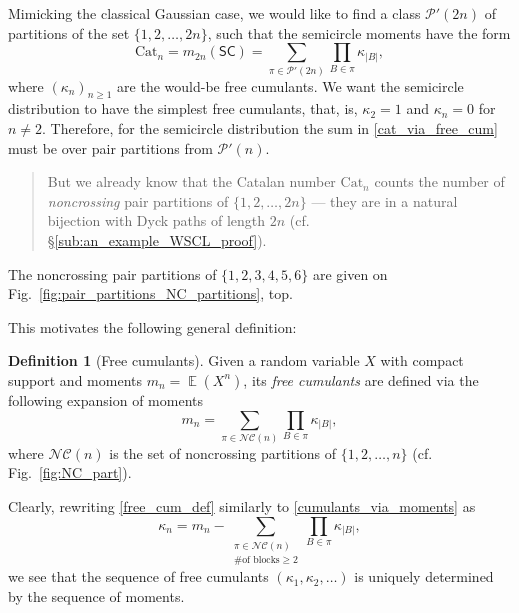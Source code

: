 \documentclass[letterpaper,11pt,oneside,reqno]{amsart}
\numberwithin{equation}{section}
\newcommand{\SC}{\mathsf{SC}}
\DeclareMathOperator{\EE}{\mathbb{E}}
\theoremstyle{definition}
\newtheorem{definition}[proposition]{Definition}
\begin{document}
Mimicking the classical Gaussian case, we would like to
find a class $\mathcal{P}'(2n)$ of partitions of the set $\{1,2,\ldots,2n\}$, such that the semicircle
moments have the form
\begin{equation}\label{cat_via_free_cum}
	\mathrm{Cat}_{n}=m_{2n}(\SC)=\sum_{\pi\in \mathcal{P}'(2n)}\prod_{B\in\pi} \kappa_{|B|},
\end{equation}
where $(\kappa_n)_{n\ge1}$ are the would-be free cumulants.
We want the semicircle distribution to have the simplest free cumulants, 
that, is, $\kappa_2=1$ and $\kappa_n=0$ for $n\ne2$.
Therefore, for the semicircle distribution
the sum in \eqref{cat_via_free_cum} must be over pair partitions from 
$\mathcal{P}'(n)$. 
\begin{quote}
	But we already know that the 
	Catalan number $\mathrm{Cat}_{n}$ counts the 
	number of \emph{noncrossing} pair partitions of $\{1,2,\ldots,2n\}$
	--- they are in a natural bijection with Dyck paths 
	of length $2n$ (cf. \S \ref{sub:an_example_WSCL_proof}).
\end{quote}
The noncrossing pair partitions of $\{1,2,3,4,5,6\}$ are given on 
Fig.~\ref{fig:pair_partitions_NC_partitions}, top.

This motivates the following general definition:
\begin{definition}[Free cumulants]
	Given a random variable $X$ with compact support and moments
	$m_n=\EE(X^{n})$, its \emph{free cumulants} are defined via the following expansion of moments
	\begin{equation}\label{free_cum_def}
		m_n=\sum_{\pi\in \mathcal{NC}(n)}\prod_{B\in\pi} \kappa_{|B|},
	\end{equation}
	where $\mathcal{NC}(n)$ is the set of noncrossing partitions of $\{1,2,\ldots,n\}$
	(cf. Fig.~\ref{fig:NC_part}).
\end{definition}
Clearly, rewriting \eqref{free_cum_def} similarly to \eqref{cumulants_via_moments} as
\begin{equation}\label{free_cum_via_mom}
	\kappa_n=m_n-\sum_{\substack{\pi\in\mathcal{NC}(n)\\\text{\# of blocks}\geq 2}} \prod_{B\in \pi} \kappa_{|B|},
\end{equation}
we see that the sequence of free cumulants $(\kappa_1,\kappa_2,\ldots)$
is uniquely determined by the sequence of moments.
\end{document}
